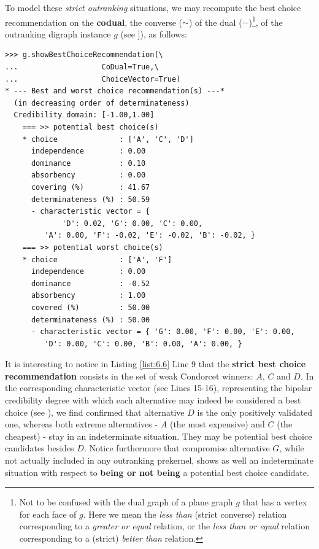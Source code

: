 To model these \emph{strict outranking} situations, we may recompute the best choice recommendation on the \textbf{codual}, the converse ($\sim$) of the dual ($-$)\footnote{Not to be confused with the dual graph of a plane graph $g$ that has a vertex for each face of $g$. Here we mean the \emph{less than} (strict converse) relation corresponding to a \emph{greater or equal} relation, or the \emph{less than or equal} relation corresponding to a (strict) \emph{better than} relation.}, of the outranking digraph instance $g$ (see \citet{BIS-2013}]), as follows:

\begin{lstlisting}[caption={Computing the strict best choice recommendation},label=list:6.6]
>>> g.showBestChoiceRecommendation(\
...                   CoDual=True,\
...                   ChoiceVector=True)   
* --- Best and worst choice recommendation(s) ---*
  (in decreasing order of determinateness)   
  Credibility domain: [-1.00,1.00]
    === >> potential best choice(s)
    * choice              : ['A', 'C', 'D']
      independence        : 0.00
      dominance           : 0.10
      absorbency          : 0.00
      covering (%)        : 41.67
      determinateness (%) : 50.59
      - characteristic vector = {
             'D': 0.02, 'G': 0.00, 'C': 0.00,
	     'A': 0.00, 'F': -0.02, 'E': -0.02, 'B': -0.02, }
    === >> potential worst choice(s) 
    * choice              : ['A', 'F']
      independence        : 0.00
      dominance           : -0.52
      absorbency          : 1.00
      covered (%)         : 50.00
      determinateness (%) : 50.00
      - characteristic vector = { 'G': 0.00, 'F': 0.00, 'E': 0.00,
	     'D': 0.00, 'C': 0.00, 'B': 0.00, 'A': 0.00, }
\end{lstlisting}				  

It is interesting to notice in Listing \ref{list:6.6} Line 9 that the \textbf{strict best choice recommendation} consists in the set of weak Condorcet winners: $A$, $C$ and $D$. In the corresponding characteristic vector (see Lines 15-16), representing the bipolar credibility degree with which each alternative may indeed be considered a best choice (see \citet{BIS-2006a,BIS-2006b}), we find confirmed that alternative $D$ is the only positively validated one, whereas both extreme alternatives - $A$ (the most expensive) and $C$ (the cheapest) - stay in an indeterminate situation. They may be potential best choice candidates besides $D$. Notice furthermore that compromise alternative $G$, while not actually included in any outranking prekernel, shows as well an indeterminate situation with respect to \textbf{being or not being} a potential best choice candidate. 

